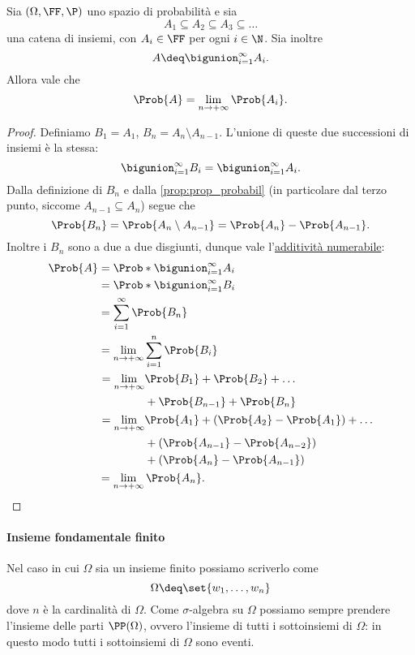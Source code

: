 \begin{proposition}
    Sia $(\Omega, \FF, \P)$ uno spazio di probabilità e sia \[
        A_1 \subseteq A_2 \subseteq A_3 \subseteq \dots    
    \] una catena di insiemi, con $A_i \in \FF$ per ogni $i \in \N$. Sia inoltre \[
        A \deq \bigunion_{i=1}^\infty A_i.    
    \] Allora vale che \begin{equation}
        \Prob{A} = \lim_{n \to +\infty} \Prob{A_i}.
    \end{equation}
\end{proposition}
\begin{proof}
    Definiamo $B_1 = A_1$, $B_n = A_n \setminus A_{n-1}$. L'unione di queste due successioni di insiemi è la stessa: \[
        \bigunion_{i=1}^\infty B_i = \bigunion_{i=1}^\infty A_i.    
    \] Dalla definizione di $B_n$ e dalla \autoref{prop:prop_probabil} (in particolare dal terzo punto, siccome $A_{n-1} \subseteq A_n$) segue che \[
        \Prob{B_n} = \Prob{A_n \setminus A_{n-1}} = \Prob{A_n} - \Prob{A_{n-1}}.
    \] Inoltre i $B_n$ sono a due a due disgiunti, dunque vale l'\hyperref[def:prob_numerab_add]{additività numerabile}: \begin{align*}
        \Prob{A} &= \Prob*{\bigunion_{i=1}^\infty A_i} \\
        &= \Prob*{\bigunion_{i=1}^\infty B_i}\\
        &= \sum_{i=1}^\infty \Prob{B_n}\\
        &= \lim_{n\to +\infty} \sum_{i=1}^n \Prob{B_i}\\
        &\begin{aligned}
            \ = \lim_{n \to +\infty} &\Prob{B_1} + \Prob{B_2} + \dots \\
            &+ \Prob{B_{n-1}} + \Prob{B_n}\\
        \end{aligned}\\
        &\begin{aligned}
            \ = \lim_{n \to +\infty} &\Prob{A_1} + (\Prob{A_2} - \Prob{A_1}) + \dots\\
            &+ (\Prob{A_{n-1}} - \Prob{A_{n-2}})\\
            &+ (\Prob{A_{n}} - \Prob{A_{n-1}})
        \end{aligned}\\
        &= \lim_{n \to +\infty} \Prob{A_n}. \qedhere
    \end{align*}
\end{proof}

\paragraph{Insieme fondamentale finito} Nel caso in cui $\Omega$ sia un insieme finito possiamo scriverlo come \[
    \Omega \deq \set{w_1, \dots, w_n}    
\] dove $n$ è la cardinalità di $\Omega$. Come $\sigma$-algebra su $\Omega$ possiamo sempre prendere l'insieme delle parti $\PP(\Omega)$, ovvero l'insieme di tutti i sottoinsiemi di $\Omega$: in questo modo tutti i sottoinsiemi di $\Omega$ sono eventi.

